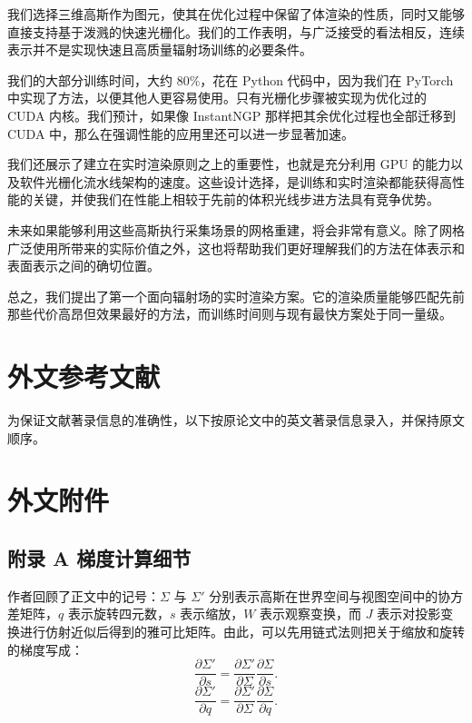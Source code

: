 我们选择三维高斯作为图元，使其在优化过程中保留了体渲染的性质，同时又能够直接支持基于泼溅的快速光栅化。我们的工作表明，与广泛接受的看法相反，连续表示并不是实现快速且高质量辐射场训练的必要条件。

我们的大部分训练时间，大约 \(80\%\)，花在 Python 代码中，因为我们在 PyTorch 中实现了方法，以便其他人更容易使用。只有光栅化步骤被实现为优化过的 CUDA 内核。我们预计，如果像 InstantNGP 那样把其余优化过程也全部迁移到 CUDA 中，那么在强调性能的应用里还可以进一步显著加速。

我们还展示了建立在实时渲染原则之上的重要性，也就是充分利用 GPU 的能力以及软件光栅化流水线架构的速度。这些设计选择，是训练和实时渲染都能获得高性能的关键，并使我们在性能上相较于先前的体积光线步进方法具有竞争优势。

未来如果能够利用这些高斯执行采集场景的网格重建，将会非常有意义。除了网格广泛使用所带来的实际价值之外，这也将帮助我们更好理解我们的方法在体表示和表面表示之间的确切位置。

总之，我们提出了第一个面向辐射场的实时渲染方案。它的渲染质量能够匹配先前那些代价高昂但效果最好的方法，而训练时间则与现有最快方案处于同一量级。

\section{外文参考文献}

为保证文献著录信息的准确性，以下按原论文中的英文著录信息录入，并保持原文顺序。



\section{外文附件}

\subsection{附录 A 梯度计算细节}

作者回顾了正文中的记号：\(\Sigma\) 与 \(\Sigma'\) 分别表示高斯在世界空间与视图空间中的协方差矩阵，\(q\) 表示旋转四元数，\(s\) 表示缩放，\(W\) 表示观察变换，而 \(J\) 表示对投影变换进行仿射近似后得到的雅可比矩阵。由此，可以先用链式法则把关于缩放和旋转的梯度写成：
\begin{equation}
    \frac{\partial \Sigma'}{\partial s}
    =
    \frac{\partial \Sigma'}{\partial \Sigma}
    \frac{\partial \Sigma}{\partial s}.
\end{equation}
\begin{equation}
    \frac{\partial \Sigma'}{\partial q}
    =
    \frac{\partial \Sigma'}{\partial \Sigma}
    \frac{\partial \Sigma}{\partial q}.
\end{equation}

